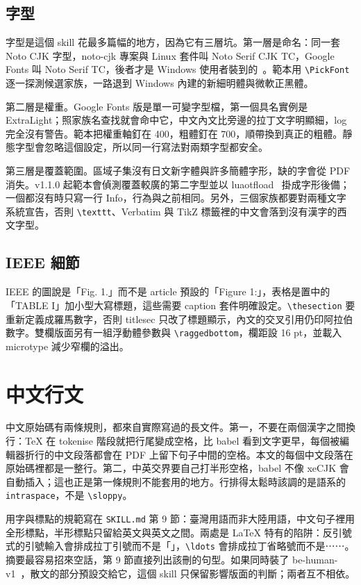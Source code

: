 \subsection{字型}

字型是這個 skill 花最多篇幅的地方，因為它有三層坑。第一層是命名：同一套 Noto CJK 字型，noto-cjk 專案與 Linux 套件叫 Noto Serif CJK TC，Google Fonts 叫 Noto Serif TC，後者才是 Windows 使用者裝到的~\cite{notocjk}。範本用 \texttt{\textbackslash PickFont} 逐一探測候選家族，一路退到 Windows 內建的新細明體與微軟正黑體。

第二層是權重。Google Fonts 版是單一可變字型檔，第一個具名實例是 ExtraLight；照家族名查找就會命中它，中文內文比旁邊的拉丁文字明顯細，log 完全沒有警告。範本把權重軸釘在 400，粗體釘在 700，順帶換到真正的粗體。靜態字型會忽略這個設定，所以同一行寫法對兩類字型都安全。

第三層是覆蓋範圍。區域子集沒有日文新字體與許多簡體字形，缺的字會從 PDF 消失。v1.1.0 起範本會偵測覆蓋較廣的第二字型並以 luaotfload~\cite{luaotfload} 掛成字形後備；一個都沒有時只寫一行 Info，行為與之前相同。另外，三個家族都要對兩種文字系統宣告，否則 \texttt{\textbackslash texttt}、Verbatim 與 TikZ 標籤裡的中文會落到沒有漢字的西文字型。

\subsection{IEEE 細節}

IEEE 的圖說是「Fig. 1.」而不是 article 預設的「Figure 1:」，表格是置中的「TABLE I」加小型大寫標題，這些需要 caption 套件明確設定。\texttt{\textbackslash thesection} 要重新定義成羅馬數字，否則 titlesec 只改了標題顯示，內文的交叉引用仍印阿拉伯數字。雙欄版面另有一組浮動體參數與 \texttt{\textbackslash raggedbottom}，欄距設 16 pt，並載入 microtype 減少窄欄的溢出。

\FloatBarrier
\section{中文行文}
\label{sec:prose}

中文原始碼有兩條規則，都來自實際寫過的長文件。第一，不要在兩個漢字之間換行：TeX 在 tokenise 階段就把行尾變成空格，比 babel 看到文字更早，每個被編輯器折行的中文段落都會在 PDF 上留下句子中間的空格。本文的每個中文段落在原始碼裡都是一整行。第二，中英交界要自己打半形空格，babel 不像 xeCJK 會自動插入；這也正是第一條規則不能套用的地方。行排得太鬆時該調的是語系的 \texttt{intraspace}，不是 \verb|\sloppy|。

用字與標點的規範寫在 \texttt{SKILL.md} 第 9 節：臺灣用語而非大陸用語，中文句子裡用全形標點，半形標點只留給英文與英文之間。兩處是 LaTeX 特有的陷阱：反引號式的引號輸入會排成拉丁引號而不是「」，\verb|\ldots| 會排成拉丁省略號而不是⋯⋯。摘要最容易招來空話，第 9 節直接列出該刪的句型。如果同時裝了 be-human-v1~\cite{behuman}，散文的部分預設交給它，這個 skill 只保留影響版面的判斷；兩者互不相依。

